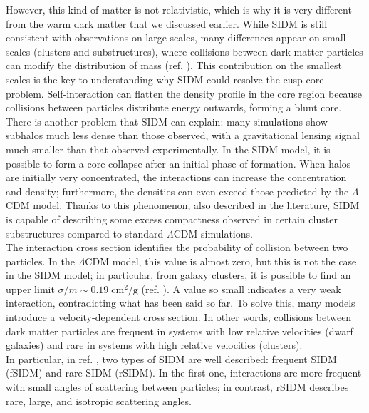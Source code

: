 However, this kind of matter is not relativistic, which is why it is very different from the warm dark matter that we discussed earlier. While SIDM is still consistent with observations on large scales, many differences appear on small scales (clusters and substructures), where collisions between dark matter particles can modify the distribution of mass (ref. \cite{SIDM_2000_Spergerl}).
This contribution on the smallest scales is the key to understanding why SIDM could resolve the cusp-core problem.
Self-interaction can flatten the density profile in the core region because collisions between particles distribute energy outwards, forming a blunt core.
There is another problem that SIDM can explain: many simulations show subhalos much less dense than those observed, with a gravitational lensing signal much smaller than that observed experimentally. In the SIDM model, it is possible to form a core collapse after an initial phase of formation. When halos are initially very concentrated, the interactions can increase the concentration and density; furthermore, the densities can even exceed those predicted by the $\Lambda$CDM model. Thanks to this phenomenon, also described in the literature, SIDM is capable of describing some excess compactness observed in certain cluster substructures compared to standard $\Lambda$CDM simulations.\\

The interaction cross section identifies the probability of collision between two particles. In the $\Lambda$CDM model, this value is almost zero, but this is not the case in the SIDM model; in particular, from galaxy clusters, it is possible to find an upper limit $\sigma/m \sim 0.19 \; \text{cm}^2/\text{g}$ (ref. \cite{SIDM_cross_section_upper_limit}).
A value so small indicates a very weak interaction, contradicting what has been said so far. To solve this, many models introduce a velocity-dependent cross section. In other words, collisions between dark matter particles are frequent in systems with low relative velocities (dwarf galaxies) and rare in systems with high relative velocities (clusters).\\

In particular, in ref. 
\cite{Galaxy-cluster-self-interacting-dark-matter-simulations}, two types of SIDM are well described: frequent SIDM (fSIDM) and rare SIDM (rSIDM).
In the first one, interactions are more frequent with small angles of scattering between particles; in contrast, rSIDM describes rare, large, and isotropic scattering angles.\\

